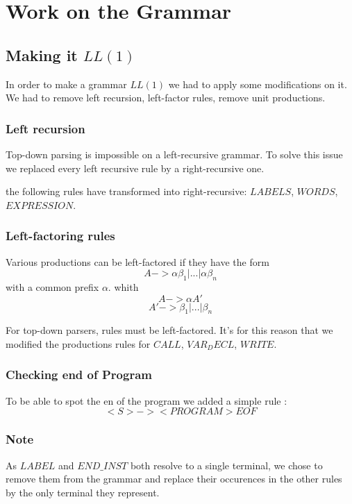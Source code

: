 \newpage\cleardoublepage{}
\section{Work on the Grammar}


\subsection{Making it $LL(1)$}
In order to make a grammar $LL(1)$ we had to apply some modifications on it. We had to remove left recursion, left-factor rules, remove unit productions.

\subsubsection{Left recursion}

Top-down parsing is impossible on a left-recursive grammar. To solve this issue we replaced every left recursive rule by a right-recursive one.

the following rules have transformed into right-recursive: $LABELS$, $WORDS$, $EXPRESSION$.


\subsubsection{Left-factoring rules}
Various productions can be left-factored if they have the form
$$A -> \alpha \beta_{1} | ... | \alpha\beta_{n}$$
with a common prefix $\alpha$.
whith
$$A -> \alpha A'$$
$$A' -> \beta_{1} | ... | \beta_{n}$$

For top-down parsers, rules must be left-factored.
It's for this reason that we modified the productions rules for
$CALL$, $VAR_DECL$, $WRITE$.


\subsubsection{Checking end of Program}

To be able to spot the en of the program we added a simple rule :
$$<S> -> <PROGRAM> EOF$$

\subsubsection{Note}

As $LABEL$ and $END\_INST$ both resolve to a single terminal, we chose to remove them from the grammar and replace their occurences in the other rules by the only terminal they represent.

